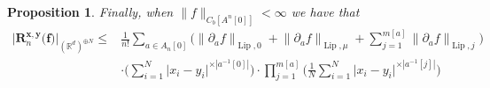 \documentclass[a4paper,11pt,twoside]{article}
\numberwithin{equation}{section}
\theoremstyle{plain}
\newtheorem{proposition}[theorem]{Proposition}
\newcommand{\bR}{\mathbb{R}}
\DeclareMathOperator{\lip}{Lip}
\newcommand{\1}{\mathbbm{1}}
\begin{document}
\begin{proposition}
		Finally, when $\big\| f \big\|_{C_b[A^n[0]]}< \infty$ we have that
		\begin{align}
			\nonumber
			\Big| \boldsymbol{R}_n^{\boldsymbol{x}, \boldsymbol{y}}\big( \boldsymbol{f} \big) \Big|_{(\bR^d)^{\oplus N}} \leq& \tfrac{1}{n!} \sum_{a\in A_n[0]} \bigg( \big\| \partial_a f \big\|_{\lip, 0} + \big\| \partial_a f \big\|_{\lip, \mu} + \sum_{j=1}^{m[a]} \big\| \partial_a f \big\|_{\lip, j} \bigg) 
			\\
			\label{eq:proposition:classicTay<=>LionsTayRem++}
			&\cdot \bigg( \sum_{i=1}^N \big| x_i - y_i \big|^{\times |a^{-1}[0]|} \bigg) \cdot \prod_{j=1}^{m[a]} \bigg( \frac{1}{N} \sum_{i=1}^N \big| x_i - y_i \big|^{\times |a^{-1}[j]|} \bigg) 
		\end{align}
	\end{proposition}
\end{document}
